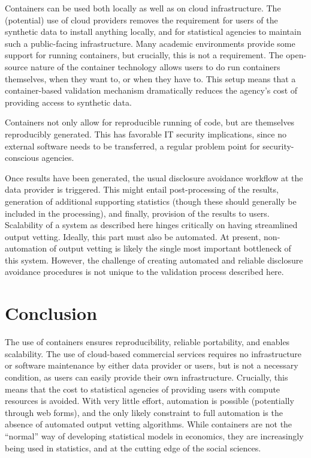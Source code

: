 \documentclass[12pt]{article}
\begin{document}
Containers can be used both locally as well as on cloud infrastructure. The (potential) use of cloud providers removes the requirement for users of the synthetic data to install anything locally, and for statistical agencies to maintain such a public-facing infrastructure. Many academic environments provide some support for running containers, but crucially, this is not a requirement. The open-source nature of the container technology allows users to do run containers themselves, when they want to, or when they have to. This setup means that a container-based validation mechanism  dramatically reduces the agency's cost of providing access to synthetic data.

Containers not only allow for reproducible running of code, but are themselves reproducibly generated. This has favorable IT security implications, since no external software needs to be transferred, a regular problem point for security-conscious agencies.


Once results have been generated, the usual disclosure avoidance workflow at the data provider is triggered. This might entail post-processing of the results, generation of additional supporting statistics (though these should generally be included in the processing), and finally, provision of the results to users. 
%
Scalability of a system as described here hinges critically on having streamlined output vetting. Ideally, this  part must also be automated. At present, non-automation of output vetting is likely the single most important bottleneck of this system. However, the challenge of creating automated and reliable disclosure avoidance procedures is  not unique to the validation process described here.


\section{Conclusion}

The use of containers ensures reproducibility, reliable portability, and enables scalability. The use of cloud-based commercial services requires no infrastructure or software maintenance by either data provider or users, but is not a necessary condition, as users can easily provide their own infrastructure. Crucially, this means that the cost to statistical agencies of providing users with compute resources is avoided. With very little effort, automation is possible (potentially through web forms), and the only likely constraint to full automation is the absence of automated output vetting algorithms. While containers are not the ``normal'' way of developing statistical models in economics, they are increasingly being used in statistics, and at the cutting edge of the social sciences. 
\end{document}

